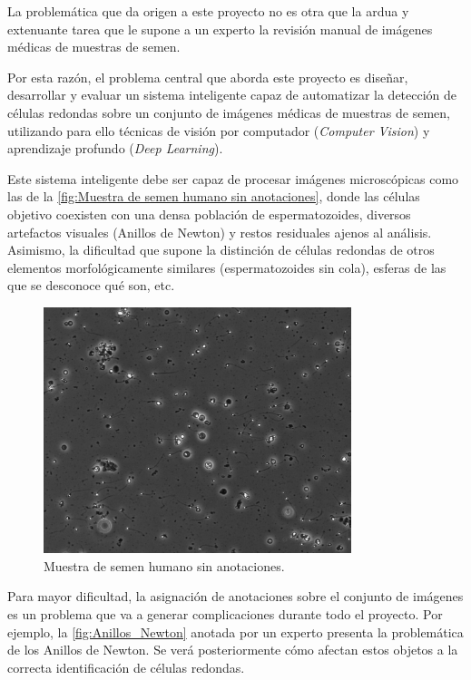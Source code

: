 \documentclass[12pt,a4paper,onecolumn,oneside]{report}
\begin{document}
La problemática que da origen a este proyecto no es otra que la ardua y extenuante tarea que le supone a un experto la revisión manual de imágenes médicas de muestras de semen.

Por esta razón, el problema central que aborda este proyecto es diseñar, desarrollar y evaluar un sistema inteligente capaz de automatizar la detección de células 
redondas sobre un conjunto de imágenes médicas de muestras de semen, utilizando para ello técnicas de visión por computador (\textit{Computer Vision}) y aprendizaje profundo (\textit{Deep Learning}).

Este sistema inteligente debe ser capaz de procesar imágenes microscópicas como las de la \autoref{fig:Muestra de semen humano sin anotaciones}, donde las células objetivo coexisten con una densa población de espermatozoides, diversos artefactos visuales (Anillos de Newton)
y restos residuales ajenos al análisis. Asimismo, la dificultad que supone la distinción de células redondas de otros elementos morfológicamente similares (espermatozoides sin cola), esferas de las que se desconoce qué son, etc.

\begin{figure}[H]
  \centering
  \includegraphics[width=0.8\textwidth]{figuras/rounds_cells/61.jpg}
  \caption{Muestra de semen humano sin anotaciones.}
  \label{fig:Muestra de semen humano sin anotaciones}
\end{figure}

Para mayor dificultad, la asignación de anotaciones sobre el conjunto de imágenes es un problema que va a generar complicaciones durante todo el proyecto. Por ejemplo,
la \autoref{fig:Anillos_Newton} anotada por un experto presenta la problemática de los Anillos de Newton. Se verá posteriormente cómo afectan estos objetos a la correcta identificación de células redondas.
\end{document}
